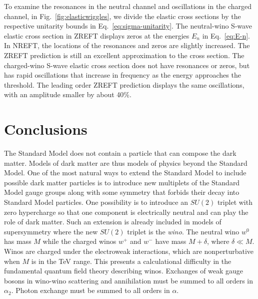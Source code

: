 \documentclass[%
 reprint,
 amsmath,amssymb,
 aps,
]{revtex4-1}
\begin{document}
To examine the resonances in the neutral channel and oscillations in the charged channel, in Fig.~\ref{fig:elasticwiggles}, we divide the elastic cross sections by the respective unitarity bounds in Eq.~\eqref{eq:sigma-unitarity}.
The neutral-wino S-wave elastic cross section in ZREFT displays zeros at the energies $E_n$ in Eq.~\eqref{eq:E-n}.
In NREFT, the locations of the resonances and zeros are slightly increased.
The ZREFT prediction is still an excellent approximation to the cross section.
The charged-wino S-wave elastic cross section does not have resonances or zeros, but has rapid oscillations that increase in frequency as the energy approaches the threshold.
The leading order ZREFT prediction displays the same oscillations, with an amplitude smaller by about 40\%.


\section{Conclusions}
\label{sec:summary}

The Standard Model does not contain a particle that can compose the dark matter.
Models of dark matter are thus models of physics beyond the Standard Model.
One of the most natural ways to extend the Standard Model to include possible dark matter particles is to introduce new multiplets of the Standard Model gauge groups along with some symmetry that forbids their decay into Standard Model particles.
One possibility is to introduce an $SU(2)$ triplet with zero hypercharge so that one component is electrically neutral and can play the role of dark matter.
Such an extension is already included in models of supersymmetry where the new $SU(2)$ triplet is the {\it wino}.
The neutral wino $w^0$ has mass $M$ while the charged winos $w^+$ and $w^-$ have mass $M+\delta$, where $\delta \ll M$.
Winos are charged under the electroweak interactions, which are nonperturbative when $M$ is in the TeV range.
This presents a calculational difficulty in the fundamental quantum field theory describing winos.
Exchanges of weak gauge bosons in wino-wino scattering and annihilation must be summed to all orders in $\alpha_2$.
Photon exchange must be summed to all orders in $\alpha$.
\end{document}
